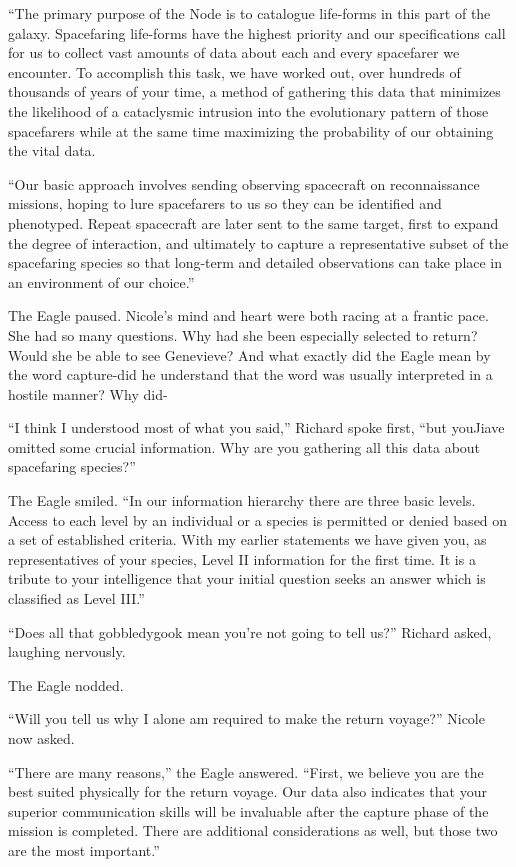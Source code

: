 \documentclass[]{article}
\begin{document}
{“The primary purpose of the Node is to catalogue life-forms in this part of the galaxy.  Spacefaring life-forms have the highest priority and our specifications call for us to collect vast amounts of data about each and every spacefarer we encounter.  To accomplish this task, we have worked out, over hundreds of thousands of years of your time, a method of gathering this data that minimizes the likelihood of a cataclysmic intrusion into the evolutionary pattern of those spacefarers while at the same time maximizing the probability of our obtaining the vital data.

“Our basic approach involves sending observing spacecraft on reconnaissance missions, hoping to lure spacefarers to us so they can be identified and phenotyped.  Repeat spacecraft are later sent to the same target, first to expand the degree of interaction, and ultimately to capture a representative subset of the spacefaring species so that long-term and detailed observations can take place in an environment of our choice.”

The Eagle paused.  Nicole’s mind and heart were both racing at a frantic pace.  She had so many questions.  Why had she been especially selected to return? Would she be able to see Genevieve? And what exactly did the Eagle mean by the word capture-did he understand that the word was usually interpreted in a hostile manner? Why did-

“I think I understood most of what you said,” Richard spoke first, “but youJiave omitted some crucial information.  Why are you gathering all this data about spacefaring species?”

The Eagle smiled.  “In our information hierarchy there are three basic levels.  Access to each level by an individual or a species is permitted or denied based on a set of established criteria.  With my earlier statements we have given you, as representatives of your species, Level II information for the first time.  It is a tribute to your intelligence that your initial question seeks an answer which is classified as Level III.”

“Does all that gobbledygook mean you’re not going to tell us?” Richard asked, laughing nervously.

The Eagle nodded.

“Will you tell us why I alone am required to make the return voyage?” Nicole now asked.

“There are many reasons,” the Eagle answered.  “First, we believe you are the best suited physically for the return voyage.  Our data also indicates that your superior communication skills will be invaluable after the capture phase of the mission is completed.  There are additional considerations as well, but those two are the most important.”

}
\end{document}
